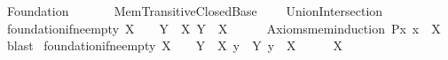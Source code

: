 %
\begin{isabellebody}%
%
%
\isadelimdocument
%
\endisadelimdocument
%
\isatagdocument
\isanewline
\isanewline
%
\isamarkuptrue%
%
\endisatagdocument
{\isafolddocument}%
%
\isadelimdocument
%
\endisadelimdocument
%
\isadelimtheory
%
\endisadelimtheory
%
\isatagtheory
{}\isamarkupfalse%
\ Foundation\isanewline
\ \ \isanewline
\ \ \ \ Mem{\isacharunderscore}{\kern0pt}Transitive{\isacharunderscore}{\kern0pt}Closed{\isacharunderscore}{\kern0pt}Base\isanewline
\ \ \ \ Union{\isacharunderscore}{\kern0pt}Intersection\isanewline
{}%
\endisatagtheory
{\isafoldtheory}%
%
\isadelimtheory
\isanewline
%
\endisadelimtheory
\isanewline
{}\isamarkupfalse%
\ foundation{\isacharunderscore}{\kern0pt}if{\isacharunderscore}{\kern0pt}ne{\isacharunderscore}{\kern0pt}empty{\isacharcolon}{\kern0pt}\ {\isachardoublequoteopen}X\ {\isasymnoteq}\ {\isacharbraceleft}{\kern0pt}{\isacharbraceright}{\kern0pt}\ {\isasymLongrightarrow}\ {\isasymexists}Y\ {\isasymin}\ X{\isachardot}{\kern0pt}\ Y\ {\isasyminter}\ X\ {\isacharequal}{\kern0pt}\ {\isacharbraceleft}{\kern0pt}{\isacharbraceright}{\kern0pt}{\isachardoublequoteclose}\isanewline
%
\isadelimproof
\ \ %
\endisadelimproof
%
\isatagproof
{}\isamarkupfalse%
\ Axioms{\isachardot}{\kern0pt}mem{\isacharunderscore}{\kern0pt}induction{\isacharbrackleft}{\kern0pt}\ {\isacharquery}{\kern0pt}P{\isacharequal}{\kern0pt}{\isachardoublequoteopen}{\isasymlambda}x{\isachardot}{\kern0pt}\ x\ {\isasymnotin}\ X{\isachardoublequoteclose}{\isacharbrackright}{\kern0pt}\ \isamarkupfalse%
\ blast%
\endisatagproof
{\isafoldproof}%
%
\isadelimproof
\isanewline
%
\endisadelimproof
\isanewline
{}\isamarkupfalse%
\ foundation{\isacharunderscore}{\kern0pt}if{\isacharunderscore}{\kern0pt}ne{\isacharunderscore}{\kern0pt}empty{\isacharprime}{\kern0pt}{\isacharcolon}{\kern0pt}\ {\isachardoublequoteopen}X\ {\isasymnoteq}\ {\isacharbraceleft}{\kern0pt}{\isacharbraceright}{\kern0pt}\ {\isasymLongrightarrow}\ {\isasymexists}Y\ {\isasymin}\ X{\isachardot}{\kern0pt}\ {\isasymnot}{\isacharparenleft}{\kern0pt}{\isasymexists}y\ {\isasymin}\ Y{\isachardot}{\kern0pt}\ y\ {\isasymin}\ X{\isacharparenright}{\kern0pt}{\isachardoublequoteclose}\isanewline
%
\isadelimproof
%
\endisadelimproof
%
\isatagproof
{}\isamarkupfalse%
\ {\isacharminus}{\kern0pt}\isanewline
\ \ \isamarkupfalse%
\ {\isachardoublequoteopen}X\ {\isasymnoteq}\ {\isacharbraceleft}{\kern0pt}{\isacharbraceright}{\kern0pt}{\isachardoublequoteclose}\isanewline

\end{isabellebody}
